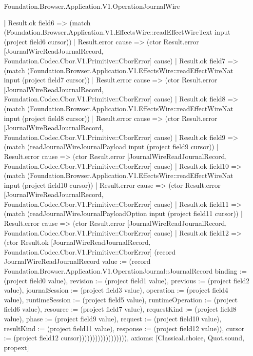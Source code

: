 \begin{lexlean}{Foundation.Browser.Application.V1.OperationJournalWire}
\begin{semanticmodule}
{                    | Result.ok field6 => (match (Foundation.Browser.Application.V1.EffectsWire::readEffectWireText input (project field6 cursor))
                      | Result.error cause => (ctor Result.error [JournalWireReadJournalRecord, Foundation.Codec.Cbor.V1.Primitive::CborError] cause)
                      | Result.ok field7 => (match (Foundation.Browser.Application.V1.EffectsWire::readEffectWireNat input (project field7 cursor))
                        | Result.error cause => (ctor Result.error [JournalWireReadJournalRecord, Foundation.Codec.Cbor.V1.Primitive::CborError] cause)
                        | Result.ok field8 => (match (Foundation.Browser.Application.V1.EffectsWire::readEffectWireNat input (project field8 cursor))
                          | Result.error cause => (ctor Result.error [JournalWireReadJournalRecord, Foundation.Codec.Cbor.V1.Primitive::CborError] cause)
                          | Result.ok field9 => (match (readJournalWireJournalPayload input (project field9 cursor))
                            | Result.error cause => (ctor Result.error [JournalWireReadJournalRecord, Foundation.Codec.Cbor.V1.Primitive::CborError] cause)
                            | Result.ok field10 => (match (Foundation.Browser.Application.V1.EffectsWire::readEffectWireNat input (project field10 cursor))
                              | Result.error cause => (ctor Result.error [JournalWireReadJournalRecord, Foundation.Codec.Cbor.V1.Primitive::CborError] cause)
                              | Result.ok field11 => (match (readJournalWireJournalPayloadOption input (project field11 cursor))
                                | Result.error cause => (ctor Result.error [JournalWireReadJournalRecord, Foundation.Codec.Cbor.V1.Primitive::CborError] cause)
                                | Result.ok field12 => (ctor Result.ok [JournalWireReadJournalRecord, Foundation.Codec.Cbor.V1.Primitive::CborError] (record JournalWireReadJournalRecord {value := (record Foundation.Browser.Application.V1.OperationJournal::JournalRecord {binding := (project field0 value), revision := (project field1 value), previous := (project field2 value), journalSession := (project field3 value), operation := (project field4 value), runtimeSession := (project field5 value), runtimeOperation := (project field6 value), resource := (project field7 value), requestKind := (project field8 value), phase := (project field9 value), request := (project field10 value), resultKind := (project field11 value), response := (project field12 value)}), cursor := (project field12 cursor)}))))))))))))))))),
  axioms: [Classical.choice, Quot.sound, propext]
}


\end{semanticmodule}
\end{lexlean}
